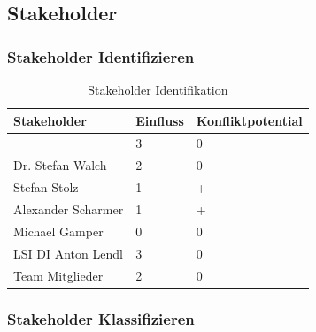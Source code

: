 

\newpage
\subsection{Stakeholder}
\subsubsection{Stakeholder Identifizieren}
\begin{table}[h]
	\centering
	\begin{tabular}{|lll|}
		\hline
		Stakeholder          & Einfluss &  Konfliktpotential      \\ \hline                         
		\getHammerl & 3         & 0                  \\ 
		Dr. Stefan Walch     & 2         & 0                  \\
		Stefan Stolz         & 1         & +                  \\ 
		Alexander Scharmer   & 1         & +                  \\ 
		Michael Gamper       & 0         & 0                  \\ 
		LSI DI Anton Lendl   & 3         & 0                  \\ 
		Team Mitglieder      & 2         & 0                   \\ \hline			
	\end{tabular}
	\caption{Stakeholder Identifikation}
	\label{Tbl_Stakeholder_Identifikation}
\end{table}


\subsubsection{Stakeholder Klassifizieren}	

